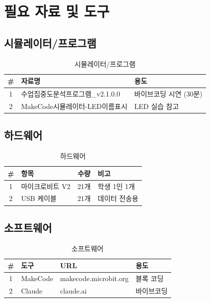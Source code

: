 \documentclass[11pt, a4paper]{article}
\begin{document}
\section{필요 자료 및 도구}

\subsection{시뮬레이터/프로그램}

\begin{table}[H]
\centering
\begin{tabularx}{\textwidth}{c l X}
\toprule
\textbf{\#} & \textbf{자료명} & \textbf{용도} \\
\midrule
1 & 수업집중도분석프로그램\_v2.1.0.0 & 바이브코딩 시연 (30분) \\
2 & MakeCode시뮬레이터-LED이름표시 & LED 실습 참고 \\
\bottomrule
\end{tabularx}
\caption{시뮬레이터/프로그램}
\end{table}

\subsection{하드웨어}

\begin{table}[H]
\centering
\begin{tabularx}{\textwidth}{c l c X}
\toprule
\textbf{\#} & \textbf{항목} & \textbf{수량} & \textbf{비고} \\
\midrule
1 & 마이크로비트 V2 & 21개 & 학생 1인 1개 \\
2 & USB 케이블 & 21개 & 데이터 전송용 \\
\bottomrule
\end{tabularx}
\caption{하드웨어}
\end{table}

\subsection{소프트웨어}

\begin{table}[H]
\centering
\begin{tabularx}{\textwidth}{c l l X}
\toprule
\textbf{\#} & \textbf{도구} & \textbf{URL} & \textbf{용도} \\
\midrule
1 & MakeCode & makecode.microbit.org & 블록 코딩 \\
2 & Claude & claude.ai & 바이브코딩 \\
\bottomrule
\end{tabularx}
\caption{소프트웨어}
\end{table}
\end{document}
